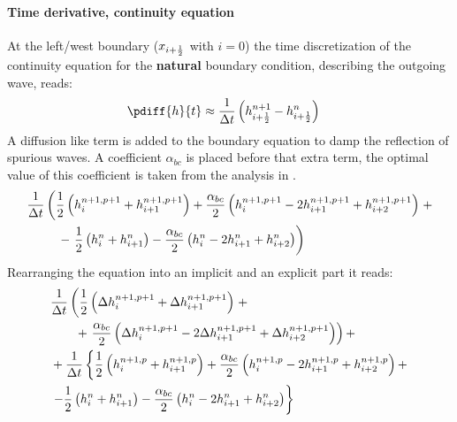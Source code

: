 \paragraph*{Time derivative, continuity equation}
At the left/west boundary ($x_{i+\frac{1}{2}}$ with $i=0$) the time discretization of the continuity equation for the \textbf{natural} boundary condition, describing the outgoing wave, reads:
\begin{align}
    \pdiff{h}{t} & \approx \frac{1}{\Dt} \left(  h^{n+1}_{i+\half} - h^{n}_{i+\half} \right)
\end{align}
A diffusion like term is added to the boundary equation to damp the reflection of spurious waves.
A coefficient $\alpha_{bc}$ is placed before that extra term, the optimal value of this coefficient is taken from the analysis in \citet{JanMooiman2025}.
\begin{align}
    & \frac{1}{\Delta t}\left( \frac{1}{2} \left( h^{n+1,p+1}_{i} + h^{n+1,p+1}_{i+1} \right)
    + \frac{\alpha_{bc}}{2} \left( h^{n+1,p+1}_{i} - 2 h^{n+1,p+1}_{i+1} + h^{n+1,p+1}_{i+2}  \right) \right. +
    \nonumber \\*
    & \qquad \,\,\, - \left.
    \frac{1}{2} \left( h^{n}_{i} + h^{n}_{i+1} \right) - \frac{\alpha_{bc}}{2}  \left( h^{n}_{i} - 2 h^{n}_{i+1} + h^{n}_{i+2}  \right)
    \right)
\end{align}
Rearranging the equation into an implicit and an explicit part it reads:
\begin{align}
    & \frac{1}{\Delta t}  \left( \frac{1}{2} \left( \Delta h^{n+1, p+1}_{i} + \Delta h^{n+1, p+1}_{i+1} \right) \right. +
    \nonumber \\*
    & \qquad + \left. \frac{\alpha_{bc}}{2}\left( \Delta h^{n+1,p+1}_{i} - 2 \Delta h^{n+1,p+1}_{i+1} + \Delta h^{n+1,p+1}_{i+2} \right) \right) +
    \nonumber \\
    & + \frac{1}{\Delta t} \left\{ \frac{1}{2} \left( h^{n+1, p}_{i} + h^{n+1, p}_{i+1} \right) + \frac{\alpha_{bc}}{2}\left(  h^{n+1,p}_{i} - 2 h^{n+1,p}_{i+1}  + h^{n+1,p}_{i+2} \right) + \right.
    \nonumber \\*
    &
    \left. - \frac{1}{2} \left( h^{n}_{i} + h^{n}_{i+1} \right)   - \frac{\alpha_{bc}}{2}  \left( h^{n}_{i} - 2 h^{n}_{i+1} + h^{n}_{i+2}  \right) \right\}
\end{align}

